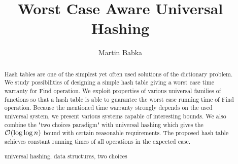 \documentclass[runningheads,a4paper]{llncs}
\newcommand{\keywords}[1]{\par\addvspace\baselineskip
\noindent\keywordname\enspace\ignorespaces#1}
\begin{document}
\mainmatter

\author{Martin Babka}

\title{Worst Case Aware Universal Hashing}



\maketitle

\begin{abstract}
Hash tables are one of the simplest yet often used solutions of the dictionary problem. 
We study possibilities of designing a simple hash table giving a worst case time warranty for Find operation.
We exploit properties of various universal families of functions so that a hash table is able to guarantee the worst case running time of Find operation.
Because the mentioned time warranty strongly depends on the used universal system, we present various systems capable of interesting bounds.
We also combine the "two choices paradigm" with universal hashing which gives the $\mathcal{O}(\log \log n)$ bound with certain reasonable requirements.
The proposed hash table achieves constant running times of all operations in the expected case.

\keywords{universal hashing, data structures, two choices}
\end{abstract}








\end{document}
